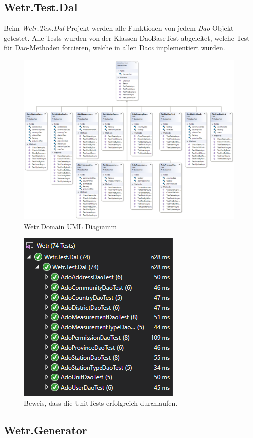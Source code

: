 \newpage
\subsection{Wetr.Test.Dal}
Beim \textit{Wetr.Test.Dal} Projekt werden alle Funktionen von jedem \textit{Dao} Objekt getestet. Alle Tests wurden von der Klassen DaoBaseTest abgeleitet, welche Test für Dao-Methoden forcieren, welche in allen Daos implementiert wurden. 

\begin{figure}[H]
\centering
\includegraphics[width=.8\textwidth]{pictures/Wetr_Test_Dal.png}
\caption{Wetr.Domain UML Diagramm}
\label{fig:Wetr.Test.Dal}
\end{figure}
\raggedright

\begin{figure}[H]
\centering
\includegraphics[width=.4\textwidth]{pictures/green_tests.png}
\caption{Beweis, dass die UnitTests erfolgreich durchlaufen.}
\label{fig:Wetr.Test.Dal}
\end{figure}
\raggedright

\newpage
\subsection{Wetr.Generator}
\label{sec:generator}


